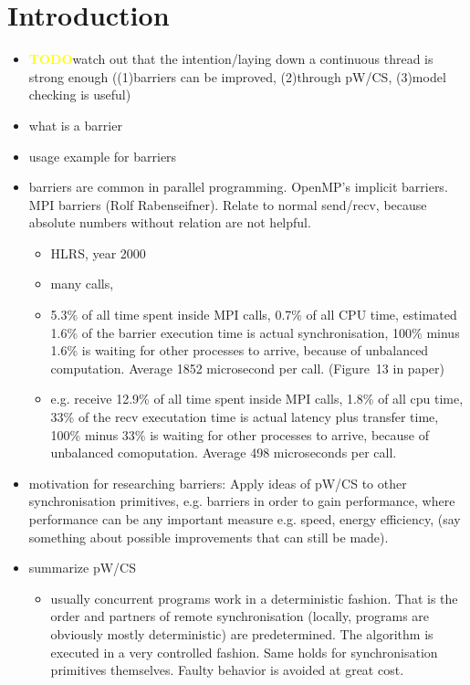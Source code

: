 \documentclass[a4paper, 10pt]{article}
\def \todo{\textbf{\textcolor{yellow}{TODO}}}
\begin{document}
\section{Introduction}
\label{sec:introduction}
\begin{itemize}
	\item \todo watch out that the intention/laying down a continuous thread is strong enough ((1)barriers can be improved, (2)through pW/CS, (3)model checking is useful)
	\item what is a barrier
	\item usage example for barriers
	\item barriers are common in parallel programming. OpenMP's\cite{openmp} implicit barriers. MPI barriers (Rolf Rabenseifner\cite{rab00}). Relate to normal send/recv, because absolute numbers without relation are not helpful.
		\begin{itemize}
			\item HLRS, year 2000
			\item many calls,
			\item 5.3\% of all time spent inside MPI calls, 0.7\% of all CPU time, estimated 1.6\% of the barrier execution time is actual synchronisation, 100\% minus 1.6\% is waiting for other processes to arrive, because of unbalanced computation. Average 1852 microsecond per call. (Figure~13 in paper)
			\item e.g. receive 12.9\% of all time spent inside MPI calls, 1.8\% of all cpu time, 33\% of the recv executation time is actual latency plus transfer time, 100\% minus 33\% is waiting for other processes to arrive, because of unbalanced comoputation. Average 498 microseconds per call.
		\end{itemize}
	\item motivation for researching barriers: Apply ideas of pW/CS\cite{pwcs} to other synchronisation primitives, e.g. barriers in order to gain performance, where performance can be any important measure e.g. speed, energy efficiency, (say something about possible improvements that can still be made).
	\item summarize pW/CS
		\begin{itemize}
			\item usually concurrent programs work in a deterministic fashion. That is the order and partners of remote synchronisation (locally, programs are obviously mostly deterministic) are predetermined. The algorithm is executed in a very controlled fashion. Same holds for synchronisation primitives themselves. Faulty behavior is avoided at great cost.

\end{itemize}
\end{itemize}
\end{document}
